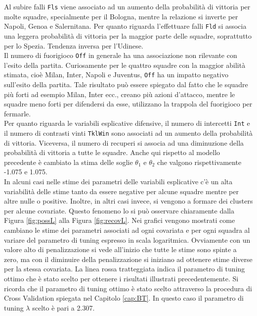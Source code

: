 Al subire falli \texttt{Fls} viene associato ad un aumento della probabilità di vittoria per molte squadre, specialmente per il Bologna, mentre la relazione si inverte per Napoli, Genoa e Salernitana. Per quanto riguarda l'effettuare falli \texttt{Fld} si associa una leggera probabilità di vittoria per la maggior parte delle squadre, soprattutto per lo Spezia. Tendenza inversa per l'Udinese.\\
Il numero di fuorigioco \texttt{Off} in generale ha una associazione non rilevante con l'esito della partita. Curiosamente per le quattro squadre con la maggior abilità stimata, cioè Milan, Inter, Napoli e Juventus, \texttt{Off} ha un impatto negativo sull'esito della partita. Tale risultato può essere spiegato dal fatto che le squadre più forti ad esempio Milan, Inter ecc., creano più azioni d'attacco, mentre le squadre meno forti per difendersi da esse, utilizzano la trappola del fuorigioco per fermarle.\\
Per quanto riguarda le variabili esplicative difensive, il numero di intercetti \texttt{Int} e il numero di contrasti vinti \texttt{TklWin} sono associati ad un aumento della probabilità di vittoria. Viceversa, il numero di recuperi si associa ad una diminuzione della probabilità di vittoria a tutte le squadre. Anche qui rispetto al modello precedente è cambiato la stima delle soglie $\theta_1$ e $\theta_2$ che valgono rispettivamente -1.075 e 1.075.\\
In alcuni casi nelle stime dei parametri delle variabili esplicative c'è un alta variabilità delle stime tanto da essere negative per alcune squadre mentre per altre nulle o positive. Inoltre, in altri casi invece, si vengono a formare dei clusters per alcune covariate. Questo fenomeno lo si può osservare chiaramente dalla Figura \ref{fig:possL} alla Figura \ref{fig:recovL}. Nei grafici vengono mostrati come cambiano le stime dei parametri associati ad ogni covariata e per ogni squadra al variare del parametro di tuning espresso in scala logaritmica. Ovviamente con un valore alto di penalizzazione si vede all'inizio che tutte le stime sono spinte a zero, ma con il diminuire della penalizzazione si iniziano ad ottenere stime diverse per la stessa covariata. La linea rossa tratteggiata indica il parametro di tuning ottimo che è stato scelto per ottenere i risultati illustrati precedentemente. Si ricorda che il parametro di tuning ottimo è stato scelto attraverso la procedura di Cross Validation spiegata nel Capitolo \ref{cap:BT}. In questo caso il parametro di tuning $\lambda$ scelto è pari a 2.307.\\

